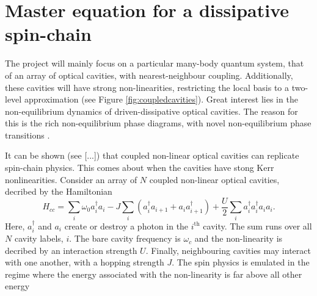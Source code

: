 \documentclass[11pt,a4paper,article,oneside]{memoir}
\begin{document}
\section{Master equation for a dissipative spin-chain}
The project will mainly focus on a particular many-body quantum
system, that of an array of optical cavities, with nearest-neighbour
coupling. Additionally, these cavities will have strong
non-linearities, restricting the local basis to a two-level
approximation (see Figure \ref{fig:coupledcavities}). Great interest
lies in the non-equilibrium dynamics of driven-dissipative optical
cavities. The reason for this is the rich non-equilibrium phase
diagrams, with novel non-equilibrium phase transitions
\cite{Diehl2008,Diehl2010,Marcos2012}.
\par It can be shown (see [...]) that coupled non-linear optical
cavities can replicate spin-chain physics. This comes about when the
cavities have stong Kerr nonlinearities. Consider an array of $N$
coupled non-linear optical cavities, decribed by the Hamiltonian
\begin{equation}
  H_{cc}=\sum_i \omega_0 a^\dagger_ia_i - J
  \sum_i(a^\dagger_ia_{i+1}+a_ia^\dagger_{i+1}) +
  \frac{U}{2}\sum_{i}a^\dagger_ia^\dagger_ia_ia_i.
\end{equation}
Here, $a^\dagger_i$ and $a_i$ create or destroy a photon in the
$i^\text{th}$ cavity. The sum runs over all $N$ cavity labels,
$i$. The bare cavity frequency is $\omega_c$ and the non-linearity is
decribed by an interaction strength $U$. Finally, neighbouring
cavities may interact with one another, with a hopping strength
$J$. The spin physics is emulated in the regime where the energy
associated with the non-linearity is far above all other energy
\end{document}
